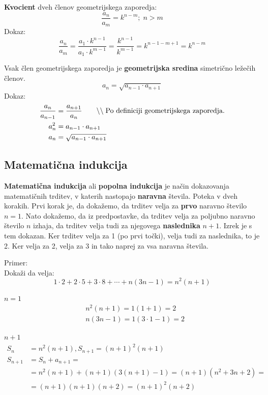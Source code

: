 \documentclass[a4paper,oneside,12pt,fleqn]{article}
\newcommand\krat\cdot
\newcommand{\comment}[1]{\ensuremath{\qquad\backslash\backslash\;}\textnormal{#1}}
\numberwithin{equation}{section}
\newenvironment{enumerate*}%
{
\vspace{-12pt}%
\begin{enumerate}%
\setlength{\itemsep}{0pt}%
\setlength{\parskip}{2pt}}%
{\end{enumerate}}
\begin{document}
\textbf{Kvocient} dveh členov geometrijskega zaporedja:
\[ \frac{a_n}{a_m} = k^{n-m}; \; n > m \]
Dokaz:
\[  \frac{a_n}{a_m} = \frac{a_1\krat k^{n-1}}{a_1\krat k^{m-1}} = \frac{k^{n-1}}{k^{m-1}} =
  k^{n-1-m+1} = k^{n-m} \]

Vsak člen geometrijskega zaporedja je \textbf{geometrijska sredina} simetrično ležečih členov.
\[ a_n = \sqrt{a_{n-1}\krat a_{n+1}} \]
Dokaz:
\begin{align*}
  \frac{a_n}{a_{n-1}} &=  \frac{a_{n+1}}{a_n} \comment{Po definiciji geometrijskega 
  zaporedja.} \\
  a_n^2 &= a_{n-1}\krat a_{n+1} \\
  a_n &= \sqrt{a_{n-1}\krat a_{n+1}}
\end{align*}

\subsection{Matematična indukcija}
\label{sec:zap:ind}
\textbf{Matematična indukcija} ali \textbf{popolna indukcija} je način dokazovanja matematičnih trditev, v
katerih nastopajo \textbf{naravna} števila. Poteka v dveh korakih. Prvi korak je, da dokažemo, da
trditev velja za \textbf{prvo} naravno število $n = 1$. Nato dokažemo, da iz predpostavke, da
trditev velja za poljubno naravno število $n$ izhaja, da trditev velja tudi za njegovega
\textbf{naslednika} $n +
1$. Izrek je s tem dokazan. Ker trditev velja za 1 (po prvi točki), velja tudi za
naslednika, to je 2. Ker velja za 2, velja za 3 in tako naprej za vsa naravna števila.

Primer: \\
Dokaži da velja:
\[ 1\krat 2 + 2\krat 5 + 3\krat 8 + \cdots + n(3n-1) = n^2(n+1) \]
\begin{enumerate*}
  \item $n = 1$
    \begin{align*}
      & n^2(n+1) = 1(1+1) = 2 \\
      & n(3n-1) = 1(3\krat 1 - 1) = 2
    \end{align*}
  \item $n + 1$
    \begin{align*}
      S_n &= n^2(n+1), S_{n+1} = (n+1)^2(n+1) \\
      S_{n+1} &= S_n + a_{n+1} = \\
      & = n^2(n+1) + (n+1)(3(n+1)-1) = (n+1)(n^2 + 3n + 2) = \\
      & = (n+1)(n+1)(n+2) = (n+1)^2(n+2)
    \end{align*}
\end{enumerate*}
\end{document}

